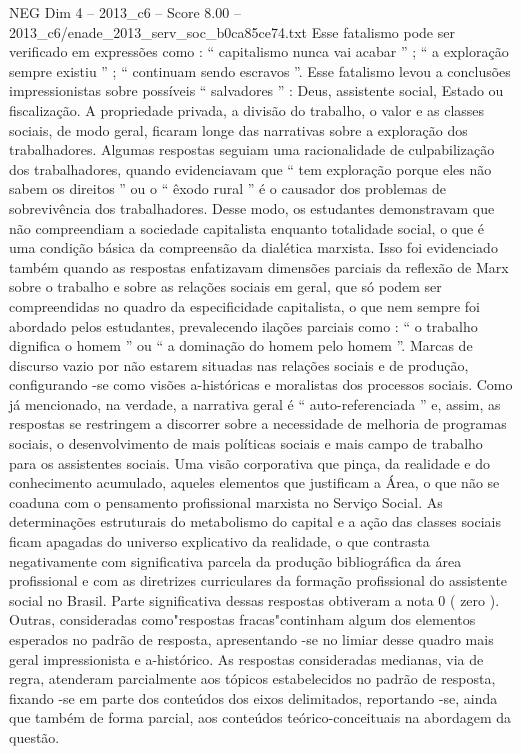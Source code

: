 \begin{textsample}{NEG Dim 4 – 2013\_c6 – Score 8.00 – 2013\_c6/enade\_2013\_serv\_soc\_b0ca85ce74.txt}
Esse fatalismo pode ser verificado em expressões como : “ capitalismo nunca vai acabar ” ; “ a exploração sempre existiu ” ; “ continuam sendo escravos ”.
Esse fatalismo levou a conclusões impressionistas sobre possíveis “ salvadores ” : Deus, assistente social, Estado ou fiscalização.
A propriedade privada, a divisão do trabalho, o valor e as classes sociais, de modo geral, ficaram longe das narrativas sobre a exploração dos trabalhadores.
Algumas respostas seguiam uma racionalidade de culpabilização dos trabalhadores, quando evidenciavam que “ tem exploração porque eles não sabem os direitos ” ou o “ êxodo rural ” é o causador dos problemas de sobrevivência dos trabalhadores.
Desse modo, os estudantes demonstravam que não compreendiam a sociedade capitalista enquanto totalidade social, o que é uma condição básica da compreensão da dialética marxista.
Isso foi evidenciado também quando as respostas enfatizavam dimensões parciais da reflexão de Marx sobre o trabalho e sobre as relações sociais em geral, que só podem ser compreendidas no quadro da especificidade capitalista, o que nem sempre foi abordado pelos estudantes, prevalecendo ilações parciais como : “ o trabalho dignifica o homem ” ou “ a dominação do homem pelo homem ”.
Marcas de discurso vazio por não estarem situadas nas relações sociais e de produção, configurando -se como visões a-históricas e moralistas dos processos sociais.
Como já mencionado, na verdade, a narrativa geral é “ auto-referenciada ” e, assim, as respostas se restringem a discorrer sobre a necessidade de melhoria de programas sociais, o desenvolvimento de mais políticas sociais e mais campo de trabalho para os assistentes sociais.
Uma visão corporativa que pinça, da realidade e do conhecimento acumulado, aqueles elementos que justificam a Área, o que não se coaduna com o pensamento profissional marxista no Serviço Social.
As determinações estruturais do metabolismo do capital e a ação das classes sociais ficam apagadas do universo explicativo da realidade, o que contrasta negativamente com significativa parcela da produção bibliográfica da área profissional e com as diretrizes curriculares da formação profissional do assistente social no Brasil.
Parte significativa dessas respostas obtiveram a nota 0 ( zero ).
Outras, consideradas como"respostas fracas"continham algum dos elementos esperados no padrão de resposta, apresentando -se no limiar desse quadro mais geral impressionista e a-histórico.
As respostas consideradas medianas, via de regra, atenderam parcialmente aos tópicos estabelecidos no padrão de resposta, fixando -se em parte dos conteúdos dos eixos delimitados, reportando -se, ainda que também de forma parcial, aos conteúdos teórico-conceituais na abordagem da questão.

\end{textsample}
